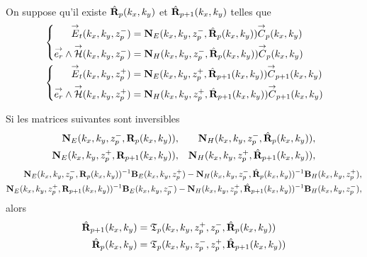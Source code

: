     \begin{prop}%
      \label{prop:plan:synthese:reflexion}{}~

      On suppose qu'il existe \(\hat{\mathbf{R}}_{p}(k_x,k_y)\) et \(\hat{\mathbf{R}}_{p+1}(k_x,k_y)\) telles que 
      \begin{align*}
      &\left\lbrace\begin{aligned}
        {\overset{\rightarrow}{E}}_t(k_x,k_y,z_p^-) &= \mathbf{N}_{E}(k_x,k_y,z_p^-,\hat{\mathbf{R}}_{p}(k_x,k_y)){\overset{\rightarrow}{C}}_{p}(k_x,k_y)
        \\
        {\overset{\rightarrow}{e_r}}\wedge{\overset{\rightarrow}{\mathcal{H}}}(k_x,k_y,z_p^-) &= \mathbf{N}_{H}(k_x,k_y,z_p^-,\hat{\mathbf{R}}_{p}(k_x,k_y)){\overset{\rightarrow}{C}}_{p}(k_x,k_y)
        \end{aligned}
      \right.
      \\
      &\left\lbrace\begin{aligned}
        {\overset{\rightarrow}{E}}_t(k_x,k_y,z_p^+) &= \mathbf{N}_{E}(k_x,k_y,z_p^+,\hat{\mathbf{R}}_{p+1}(k_x,k_y)){\overset{\rightarrow}{C}}_{p+1}(k_x,k_y)
        \\
        {\overset{\rightarrow}{e_r}}\wedge{\overset{\rightarrow}{\mathcal{H}}}(k_x,k_y,z_p^+) &= \mathbf{N}_{H}(k_x,k_y,z_p^+,\hat{\mathbf{R}}_{p+1}(k_x,k_y)){\overset{\rightarrow}{C}}_{p+1}(k_x,k_y)
        \end{aligned}
      \right.      
      \end{align*}

      Si les matrices suivantes sont inversibles
      \begin{align*}
        \mathbf{N}_{E}(k_x,k_y,z_p^-,\mathbf{R}_{p}(k_x,k_y)), && \mathbf{N}_{H}(k_x,k_y,z_p^-,\hat{\mathbf{R}}_{p}(k_x,k_y)),
        \\
        \mathbf{N}_{E}(k_x,k_y,z_p^+,\mathbf{R}_{p+1}(k_x,k_y)), && \mathbf{N}_{H}(k_x,k_y,z_p^+,\hat{\mathbf{R}}_{p+1}(k_x,k_y)),
      \end{align*}
      \begin{align*}
        \mathbf{N}_{E}(k_x,k_y,z_p^-,\mathbf{R}_{p}(k_x,k_y))^{-1}\mathbf{B}_{E}(k_x,k_y,z_p^+) - \mathbf{N}_{H}(k_x,k_y,z_p^-,\hat{\mathbf{R}}_{p}(k_x,k_y))^{-1}\mathbf{B}_{H}(k_x,k_y,z_p^+),
        \\
        \mathbf{N}_{E}(k_x,k_y,z_p^+,\mathbf{R}_{p+1}(k_x,k_y))^{-1}\mathbf{B}_{E}(k_x,k_y,z_p^-) - \mathbf{N}_{H}(k_x,k_y,z_p^+,\hat{\mathbf{R}}_{p+1}(k_x,k_y))^{-1}\mathbf{B}_{H}(k_x,k_y,z_p^-),
      \end{align*}
      alors
      \begin{align*}
        \hat{\mathbf{R}}_{p+1}(k_x,k_y) &= \mathfrak{T}_p(k_x,k_y,z_p^+,z_p^-,\hat{\mathbf{R}}_{p}(k_x,k_y))
        \\
        \hat{\mathbf{R}}_{p}(k_x,k_y) &= \mathfrak{T}_p(k_x,k_y,z_p^-,z_p^+,\hat{\mathbf{R}}_{p+1}(k_x,k_y))
      \end{align*}
    \end{prop}


